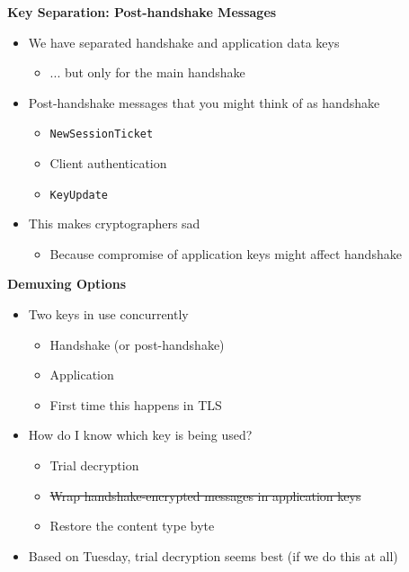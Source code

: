 \documentclass[helvetica]{seminar}
\newcommand{\heading}[1]{%
  \begin{center} 
    \large\bf 
    #1 
  \end{center} 
  \vspace{.4 in}}
\begin{document}
\begin{slide}
\heading{Key Separation: Post-handshake Messages}

\begin{itemize}
\item We have separated handshake and application data keys
  \begin{itemize}
  \item ... but only for the main handshake
  \end{itemize}

\item Post-handshake messages that you might think of as handshake
  \begin{itemize}
  \item \verb^NewSessionTicket^
  \item Client authentication
  \item \verb^KeyUpdate^
  \end{itemize}

\item This makes cryptographers sad
  \begin{itemize}
  \item Because compromise of application keys might affect handshake
  \end{itemize}
\end{itemize}
\end{slide}


\begin{slide}
\heading{Demuxing Options}

\begin{itemize}
\item Two keys in use concurrently
  \begin{itemize}
  \item Handshake (or post-handshake)
  \item Application
  \item First time this happens in TLS
  \end{itemize}

\item How do I know which key is being used?
  \begin{itemize}
  \item Trial decryption
  \item \sout{Wrap handshake-encrypted messages in application keys}
  \item Restore the content type byte
  \end{itemize}

\item Based on Tuesday, trial decryption seems best (if we do this at all)
\end{itemize}
\end{slide}
\end{document}

